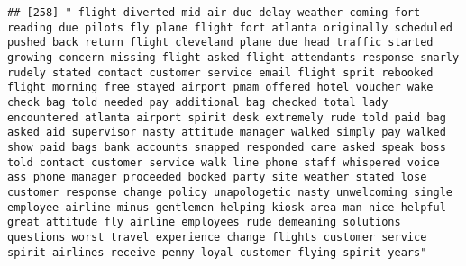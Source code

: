 \documentclass[
]{article}
\begin{document}
\begin{verbatim}
## [258] " flight diverted mid air due delay weather coming fort reading due pilots fly plane flight fort atlanta originally scheduled pushed back return flight cleveland plane due head traffic started growing concern missing flight asked flight attendants response snarly rudely stated contact customer service email flight sprit rebooked flight morning free stayed airport pmam offered hotel voucher wake check bag told needed pay additional bag checked total lady encountered atlanta airport spirit desk extremely rude told paid bag asked aid supervisor nasty attitude manager walked simply pay walked show paid bags bank accounts snapped responded care asked speak boss told contact customer service walk line phone staff whispered voice ass phone manager proceeded booked party site weather stated lose customer response change policy unapologetic nasty unwelcoming single employee airline minus gentlemen helping kiosk area man nice helpful great attitude fly airline employees rude demeaning solutions questions worst travel experience change flights customer service spirit airlines receive penny loyal customer flying spirit years"                                                                                                                                                                                                                                                                                                                                                                                                                                                                                                                                                                                                                     

\end{verbatim}
\end{document}
